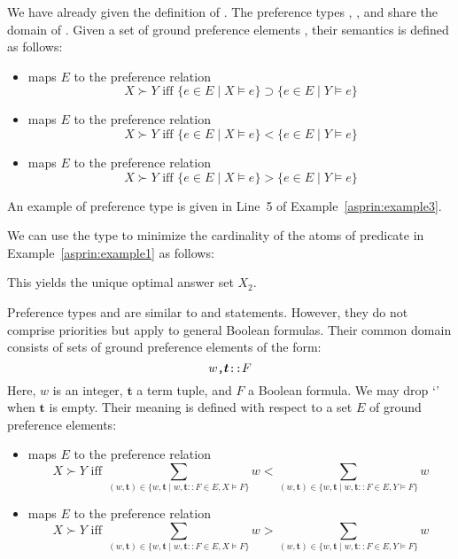 We have already given the definition of . 
The preference types , , and  share the domain of .
Given a set of ground preference elements ,
their semantics is defined as follows:
\begin{itemize}
\item
{} maps $E$ to the preference relation
\[
X \succ Y \text{ iff } \{e\in E\mid X\models e\}\supset\{e\in E\mid Y\models e\}
\]
\item
{} maps $E$ to the preference relation
\[
X \succ Y \text{ iff } \{e\in E\mid X\models e\}<\{e\in E\mid Y\models e\}
\]
\item
{} maps $E$ to the preference relation
\[
X \succ Y \text{ iff } \{e\in E\mid X\models e\}>\{e\in E\mid Y\models e\}
\]
\end{itemize}
An example of preference type  is given in Line~5 of Example~\ref{asprin:example3}.
%
\begin{example}
%
%
We can use the type  to minimize the cardinality of the atoms of predicate 
in Example~\ref{asprin:example1} as follows:
%

%
This yields the unique optimal answer set $X_2$.
\end{example}

Preference types  and 
are similar to  and  statements.
However, they do not comprise priorities but apply to general Boolean formulas.
Their common domain consists of sets of ground preference elements of the form:
\[w\texttt{,}\boldsymbol{t}\texttt{::}F\]
Here, ${w}$ is an integer, $\boldsymbol{t}$ a term tuple, and $F$ a Boolean formula.
%
We may drop `\code{,}' when $\boldsymbol{t}$ is empty.
%
Their meaning is defined with respect to a set $E$ of ground preference elements:
\begin{itemize}
\item
{} maps $E$ to the preference relation
\[
X \succ Y 
\text{ iff }
\sum_{(w,\boldsymbol{t})\in\{w,\boldsymbol{t}\mid w,\boldsymbol{t}\mathtt{::}F\in E, X\models F\}}w
<
\sum_{(w,\boldsymbol{t})\in\{w,\boldsymbol{t}\mid w,\boldsymbol{t}\mathtt{::}F\in E, Y\models F\}}w
\]
\item
{} maps $E$ to the preference relation
\[
X \succ Y 
\text{ iff }
\sum_{(w,\boldsymbol{t})\in\{w,\boldsymbol{t}\mid w,\boldsymbol{t}\mathtt{::}F\in E, X\models F\}}w
>
\sum_{(w,\boldsymbol{t})\in\{w,\boldsymbol{t}\mid w,\boldsymbol{t}\mathtt{::}F\in E, Y\models F\}}w
\]
\end{itemize}

